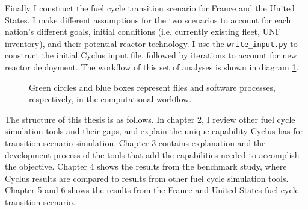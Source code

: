 Finally I construct the fuel cycle transition scenario for France and the United States.
I make different assumptions for the two scenarios to account for each nation's different goals,
initial conditions (i.e. currently existing fleet, \gls{UNF} inventory), and their potential reactor
technology. I use the \texttt{write\_input.py} to construct the initial Cyclus input file,
followed by iterations to account for new reactor deployment. The workflow of this set of 
analyses is shown in diagram \ref{diag:workflow}.


\begin{figure}
        \centering
{}
\caption{Green circles and blue boxes represent files and software 
processes, respectively, in the computational workflow.}
\label{diag:workflow}
\end{figure}


The structure of this thesis is as follows. In chapter 2, I review other fuel cycle simulation
tools and their gaps, and explain the unique capability Cyclus
has for transition scenario simulation.
Chapter 3 contains explanation and the development process of the tools that add the 
capabilities needed to accomplish the objective.
Chapter 4 shows the results from the benchmark study, where Cyclus results are compared
to results from other fuel cycle simulation tools.
Chapter 5 and 6 shows the results from the France and United States fuel cycle transition
scenario.

